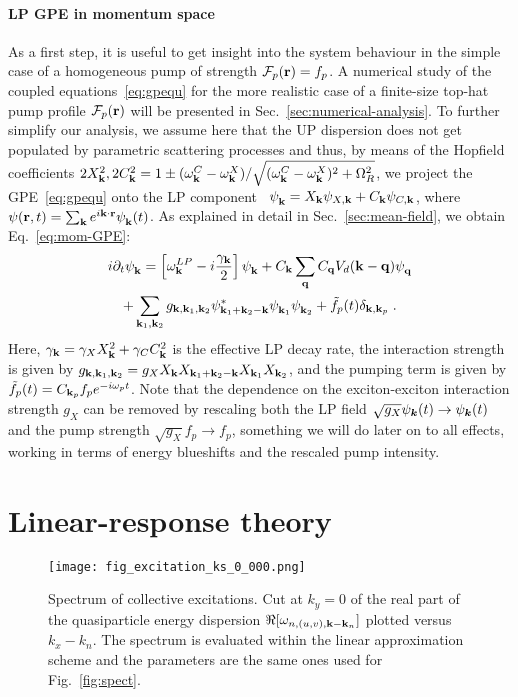 \paragraph{LP GPE in momentum space}
As a first step, it is useful to get insight into the system behaviour
in the simple case of a homogeneous pump of strength
$\mathcal{F}_p(\mathbf{r}) = f_p$. A numerical study of the coupled
equations~\eqref{eq:gpequ} for the more realistic case of a
finite-size top-hat pump profile $\mathcal{F}_p(\mathbf{r})$ will be
presented in Sec.~\ref{sec:numerical-analysis}.
%
To further simplify our analysis, we assume here that the UP
dispersion does not get populated by parametric scattering processes
and thus, by means of the Hopfield coefficients
$2X_{\mathbf{k}}^2, 2C_{\mathbf{k}}^2 = 1 \pm (\omega_{\mathbf{k}}^{C} -
\omega_{\mathbf{k}}^{X})/\sqrt{(\omega_{\mathbf{k}}^{C} -
  \omega_{\mathbf{k}}^{X})^2 + \Omega_R^2}$, we project the
GPE~\eqref{eq:gpequ} onto the LP
component~\cite{Ciuti_2001,Wouters_2007_b}
$\psi_{\mathbf{k}}^{} = X_{\mathbf{k}} \psi_{X,\mathbf{k}} + C_{\mathbf{k}}
\psi_{C,\mathbf{k}}$, where
$\psi(\mathbf{r},t) = \sum_{\mathbf{k}} e^{i\mathbf{k}\cdot \mathbf{r}}
\psi_{\mathbf{k}}^{} (t)$. As explained in detail in
Sec.~\ref{sec:mean-field}, we obtain Eq.~\eqref{eq:mom-GPE}:
%
\begin{multline}
  i\partial_t \psi_{\mathbf{k}}^{} = \left[\omega_{\mathbf{k}}^{LP} -
    i\frac{\gamma_{\mathbf{k}}}{2}\right]\psi_{\mathbf{k}}^{} +
  C_{\mathbf{k}} \sum_{\mathbf{q}} C_{\mathbf{q}} V_d(\mathbf{k} - \mathbf{q})
  \psi_{\mathbf{q}}^{}\\ + \sum_{\mathbf{k}_1, \mathbf{k}_2} g_{\mathbf{k},
    \mathbf{k}_1, \mathbf{k}_2} \psi^*_{\mathbf{k}_1 + \mathbf{k}_2-\mathbf{k}}
  \psi_{\mathbf{k}_1}^{} \psi_{\mathbf{k}_2}^{} + \tilde{f}_p(t)
  \delta_{\mathbf{k},\mathbf{k}_p}\; .
\label{eq:efflp}
\end{multline}
%
Here, $\gamma_{\mathbf{k}}=\gamma_X X_{\mathbf{k}}^2 + \gamma_C C_{\mathbf{k}}^2$
is the effective LP decay rate, the interaction strength is given by
$g_{\mathbf{k}, \mathbf{k}_1, \mathbf{k}_2}=g_X X_{\mathbf{k}} X_{\mathbf{k}_1 +
  \mathbf{k}_2-\mathbf{k}} X_{\mathbf{k}_1} X_{\mathbf{k}_2}$, and the pumping term is
given by $\tilde{f}_p(t)= C_{\mathbf{k}_p} f_p e^{-i\omega_p t}$. Note
that the dependence on the exciton-exciton interaction strength $g_X$
can be removed by rescaling both the LP field
$\sqrt{g_X}\psi_{\bm{k}}(t) \rightarrow \psi_{\bm{k}}(t)$ and the pump
strength $\sqrt{g_X}f_p \rightarrow f_p$, something we will do later
on to all effects, working in terms of energy blueshifts and the
rescaled pump intensity.


\section{Linear-response theory}
\label{sec:line-resp-theory}
%
\begin{figure}[tb]\centering
\texttt{[image: fig\_excitation\_ks\_0\_000.png]}
\caption{Spectrum of collective excitations. Cut at $k_y=0$ of the
  real part of the quasiparticle energy dispersion
  $\Re [\omega_{n,(u,v),\mathbf{k}-\mathbf{k}_n}]$ plotted versus $k_x -
  k_n$. The spectrum is evaluated within the linear approximation
  scheme and the parameters are the same ones used for
  Fig.~\ref{fig:spect}.}
\label{fig:bogol}
\end{figure}
%

